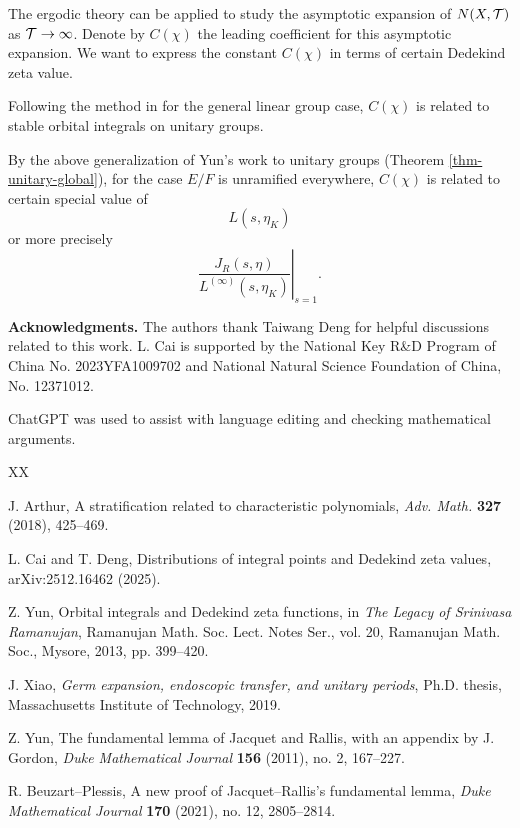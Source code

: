 \documentclass[a4paper]{amsart}
\newcommand{\sk}{\medskip}\newcommand{\bsk}{\bigskip}
\newcommand{\ra}{\rightarrow} \newcommand{\imp}{\Longrightarrow}
\newcommand{\s}{\sk\noindent}\newcommand{\bigs}{\bsk\noindent}
\theoremstyle{plain}
\theoremstyle{remark} \newtheorem{remark}[thm]{Remark}
\theoremstyle{exercise} \newtheorem{exercise}[thm]{Exercise}
\theoremstyle{example} \newtheorem{example}[thm]{Example}
\theoremstyle{question} \newtheorem{question}[thm]{Question}
\theoremstyle{assumption} \newtheorem{assumption}[thm]{Assumption}
\numberwithin{equation}{section}
\begin{document}
The ergodic theory can be applied to study the asymptotic expansion
of $N(X,{\mathcal {T}})$ as $\CT \ra \infty$. Denote by $C(\chi)$ the leading coefficient for this asymptotic expansion. We want to express the constant $C(\chi)$ in terms of certain Dedekind zeta value.  

Following the method in  \cite{CD25} for the general linear group case, $C(\chi)$ is related to stable orbital integrals on unitary groups. 

By the above generalization of Yun's work to unitary groups (Theorem \ref{thm-unitary-global}), for the case $E/F$ is unramified everywhere, $C(\chi)$ is related to certain special value of
\[ L(s,\eta_K)\]
or more precisely
\[\left. \frac{J_R(s,\eta)}{L^{(\infty)}(s,\eta_K)} \right|_{s=1}.\]


\medskip
\noindent\textbf{Acknowledgments.}
The authors thank Taiwang Deng for helpful discussions
related to this work. L. Cai is supported by the National Key R\&D Program of China No. 2023YFA1009702 and National Natural Science Foundation of China, No. 12371012. 

\s{\bf Use of artificial intelligence.} ChatGPT was used to assist with language editing and checking mathematical arguments.

\begin{thebibliography}{XX}

J. Arthur,
A stratification related to characteristic polynomials,
{\em Adv. Math.} {\bf 327} (2018), 425--469.

L. Cai and T. Deng,
Distributions of integral points and Dedekind zeta values,
arXiv:2512.16462 (2025).

Z. Yun,
Orbital integrals and Dedekind zeta functions,
in {\em The Legacy of Srinivasa Ramanujan},
Ramanujan Math. Soc. Lect. Notes Ser., vol. 20,
Ramanujan Math. Soc., Mysore, 2013, pp. 399--420.


J. Xiao,
{\em Germ expansion, endoscopic transfer, and unitary periods},
Ph.D. thesis, Massachusetts Institute of Technology, 2019.

Z. Yun, 
The fundamental lemma of Jacquet and Rallis, with an appendix by J. Gordon,  {\em Duke Mathematical Journal} {\bf 156} (2011), no. 2, 167--227.

R. Beuzart--Plessis, 
A new proof of Jacquet--Rallis’s fundamental lemma, 
{\em Duke Mathematical Journal} {\bf 170} (2021), no. 12, 2805--2814.
\end{thebibliography}
\end{document}
